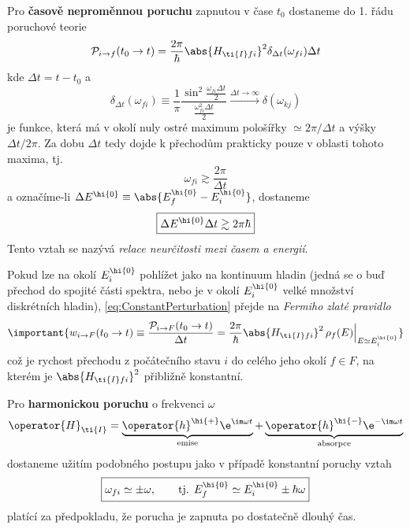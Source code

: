 Pro {\bf časově neproměnnou poruchu} zapnutou v čase $t_{0}$ dostaneme do 1. řádu 
poruchové teorie
\begin{equation}\label{eq:ConstantPerturbation}
    \mathcal{P}_{i\rightarrow f}(t_{0}\rightarrow t)
        =\frac{2\pi}{\hbar}\abs{H_{\ti{I}fi}}^{2}\delta_{\Delta t}(\omega_{fi})\Delta t
\end{equation}
kde $\Delta t=t-t_{0}$ a 
\begin{equation}
    \delta_{\Delta t}(\omega_{fi})
        \equiv\frac{1}{\pi}\frac{\sin^{2}
            \frac{\omega_{fi}\Delta t}{2}}{\frac{\omega^{2}_{fi}\Delta t}{2}}
        \xrightarrow{\Delta t\rightarrow\infty}\delta(\omega_{kj})
\end{equation}
je funkce, která má v okolí nuly ostré maximum pološířky $\simeq2\pi/\Delta t$ 
a výšky $\Delta t/2\pi$.
Za dobu $\Delta t$ tedy dojde k přechodům prakticky pouze v oblasti tohoto maxima, tj.
\begin{equation}
    \omega_{fi}
        \gtrsim\frac{2\pi}{\Delta t}
\end{equation}
a označíme-li $\Delta E^{\hi{0}}\equiv\abs{E^{\hi{0}}_{f}-E^{\hi{0}}_{i}}$, dostaneme
\begin{equation}
    \boxed{\Delta E^{\hi{0}}\Delta t
        \gtrsim2\pi\hbar}
\end{equation}
Tento vztah se nazývá \emph{relace neurčitosti mezi časem a energií}.

Pokud lze na okolí $E_{i}^{\hi{0}}$ pohlížet jako na kontinuum hladin (jedná se o buď přechod do spojité části spektra, nebo je v okolí $E_{i}^{\hi{0}}$ velké množství diskrétních hladin), \eqref{eq:ConstantPerturbation} 
přejde na \emph{Fermiho zlaté pravidlo}
\begin{equation}\label{eq:FermiGoldenRuleConst}
    \important{
        w_{i\rightarrow F}(t_{0}\rightarrow t)
            \equiv\frac{\mathcal{P}_{i\rightarrow F}(t_{0}\rightarrow t)}{\Delta t}
            =\frac{2\pi}{\hbar}\abs{H_{\ti{I}fi}}^{2}\,
                \rho_{f}(E)\Big\vert_{E\simeq E_{i}^{\hi{0}}}
    }
\end{equation}
což je rychost přechodu z počátečního stavu $i$ do celého jeho okolí $f\in F$, 
na kterém je $\abs{H_{\ti{I}fi}}^{2}$ přibližně konstantní.

Pro {\bf harmonickou poruchu} o frekvenci $\omega$
\begin{equation}\label{eq:HarmonicPerturbation}
    \operator{H}_{\ti{I}}
        =\underbrace{\operator{h}^{\hi{+}}\e^{\im\omega t}}_{\text{emise}}
            +\underbrace{\operator{h}^{\hi{-}}\e^{-\im\omega t}}_{\text{absorpce}}
\end{equation}
dostaneme užitím podobného postupu jako v případě konstantní poruchy vztah
\begin{equation}\label{eq:HarmonicPerturbationE}
    \boxed{
        \omega_{fi}
            \simeq\pm\omega,
            \qquad\text{tj. }E_{f}^{\hi{0}}
            \simeq E_{i}^{\hi{0}}\pm\hbar\omega
    }
\end{equation}
platící za předpokladu, že porucha je zapnuta po dostatečně dlouhý čas.

